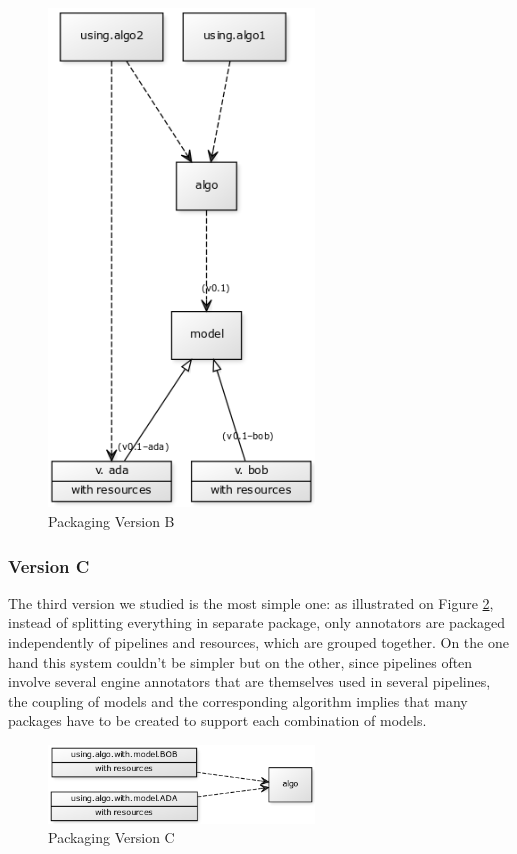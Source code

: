 \documentclass{article}
\begin{document}
\begin{figure}
\centering
\includegraphics[width=200pt]{res/packaging_version_B.png}
\caption{Packaging Version B}
\label{fig:pkgsysB}
\end{figure}


\subsubsection{Version C}

The third version we studied is the most simple one: as illustrated on Figure \ref{fig:pkgsysC}, instead of splitting everything in separate package, only annotators are packaged independently of pipelines and resources, which are grouped together. On the one hand this system couldn't be simpler but on the other, since pipelines often involve several engine annotators that are themselves used in several pipelines, the coupling of models and the corresponding algorithm implies that many packages have to be created to support each combination of models.


\begin{figure}
\centering
\includegraphics[width=200pt]{res/packaging_version_C.png}
\caption{Packaging Version C}
\label{fig:pkgsysC}
\end{figure}
\end{document}
